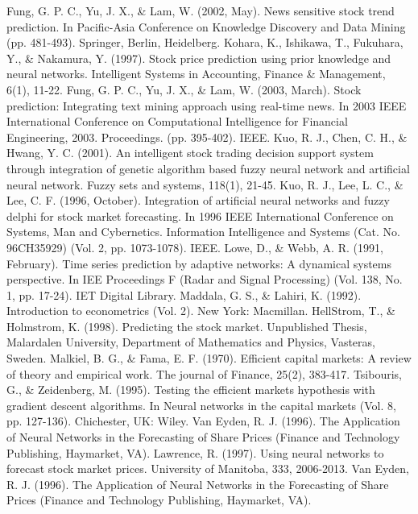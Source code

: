 \documentclass[a4paper,12pt]{report}
\begin{document}
\begin{fig}
\begin{thebibliography}{9}
	Fung, G. P. C., Yu, J. X., \& Lam, W. (2002, May). News sensitive stock trend prediction. In Pacific-Asia Conference on Knowledge Discovery and Data Mining (pp. 481-493). Springer, Berlin, Heidelberg.
	Kohara, K., Ishikawa, T., Fukuhara, Y., \& Nakamura, Y. (1997). Stock price prediction using prior knowledge and neural networks. Intelligent Systems in Accounting, Finance \& Management, 6(1), 11-22.
	Fung, G. P. C., Yu, J. X., \& Lam, W. (2003, March). Stock prediction: Integrating text mining approach using real-time news. In 2003 IEEE International Conference on Computational Intelligence for Financial Engineering, 2003. Proceedings. (pp. 395-402). IEEE.
	Kuo, R. J., Chen, C. H., \& Hwang, Y. C. (2001). An intelligent stock trading decision support system through integration of genetic algorithm based fuzzy neural network and artificial neural network. Fuzzy sets and systems, 118(1), 21-45.
	Kuo, R. J., Lee, L. C., \& Lee, C. F. (1996, October). Integration of artificial neural networks and fuzzy delphi for stock market forecasting. In 1996 IEEE International Conference on Systems, Man and Cybernetics. Information Intelligence and Systems (Cat. No. 96CH35929) (Vol. 2, pp. 1073-1078). IEEE.
	Lowe, D., \& Webb, A. R. (1991, February). Time series prediction by adaptive networks: A dynamical systems perspective. In IEE Proceedings F (Radar and Signal Processing) (Vol. 138, No. 1, pp. 17-24). IET Digital Library.
	Maddala, G. S., \& Lahiri, K. (1992). Introduction to econometrics (Vol. 2). New York: Macmillan.
	HellStrom, T., \& Holmstrom, K. (1998). Predicting the stock market. Unpublished Thesis, Malardalen University, Department of Mathematics and Physics, Vasteras, Sweden.
	Malkiel, B. G., \& Fama, E. F. (1970). Efficient capital markets: A review of theory and empirical work. The journal of Finance, 25(2), 383-417.
	Tsibouris, G., \& Zeidenberg, M. (1995). Testing the efficient markets hypothesis with gradient descent algorithms. In Neural networks in the capital markets (Vol. 8, pp. 127-136). Chichester, UK: Wiley.
	Van Eyden, R. J. (1996). The Application of Neural Networks in the Forecasting of Share Prices (Finance and Technology Publishing, Haymarket, VA).
	Lawrence, R. (1997). Using neural networks to forecast stock market prices. University of Manitoba, 333, 2006-2013.
	Van Eyden, R. J. (1996). The Application of Neural Networks in the Forecasting of Share Prices (Finance and Technology Publishing, Haymarket, VA).

\end{thebibliography}
\end{fig}
\end{document}
